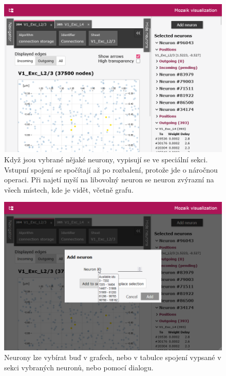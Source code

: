 \begin{figure}
	\centering
	\includegraphics[width=1\linewidth]{img/screenshot_selected_neurons.png}
	\caption{Když jsou vybrané nějaké neurony, vypisují se ve speciální sekci. Vstupní spojení se spočítají až po rozbalení, protože jde o náročnou operaci. Při najetí myší na libovolný neuron se neuron zvýrazní na všech místech, kde je vidět, včetně grafu.}
	\label{fig:selected_neurons}
\end{figure}

\begin{figure}
	\centering
	\includegraphics[width=1\linewidth]{img/screenshot_add_neuron.png}
	\caption{Neurony lze vybírat buď v grafech, nebo v tabulce spojení vypsané v sekci vybraných neuronů, nebo pomocí dialogu.}
	\label{fig:add_neuron}
\end{figure}

